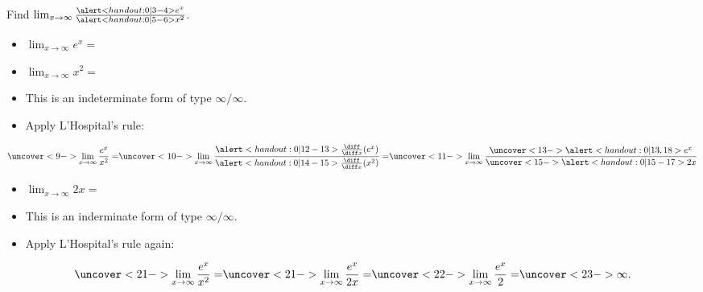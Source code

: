 \begin{frame}
\begin{example}
Find $\lim_{x\rightarrow \infty}\frac{\alert<handout:0| 3-4>{e^x}}{\alert<handout:0| 5-6>{x^2}}$.
\begin{itemize}
\item<2-| alert@3-4,18>  $\lim_{x\rightarrow \infty} e^x = $ 
\item<2-| alert@5-6>  $\lim_{x\rightarrow \infty} x^2 = $ 
\item<7->  This is an indeterminate form of type $\infty /\infty$.
\item<8->  Apply L'Hospital's rule:
\end{itemize}
\abovedisplayskip=0pt
\belowdisplayskip=0pt
\[
\uncover<9->{%
\lim_{x\rightarrow \infty} \frac{e^x}{x^2} = %
}%
\uncover<10->{%
\lim_{x\rightarrow \infty} \frac{\alert<handout:0| 12-13>{\frac{\diff}{\diff x} (e^x)}}{\alert<handout:0| 14-15>{\frac{\diff}{\diff x} (x^2)}} = %
}%
\uncover<11->{%
\lim_{x\rightarrow \infty} \frac{\uncover<13->{\alert<handout:0| 13,18>{e^x}}}{\uncover<15->{\alert<handout:0| 15-17>{2x}}} %
}%
\]
\begin{itemize}
\item<16-| alert@16-17>  $\lim_{x\rightarrow \infty} 2x = $ 
\item<19->  This is an inderminate form of type $\infty /\infty$.
\item<20->  Apply L'Hospital's rule again:
\end{itemize}
\[
\uncover<21->{%
\lim_{x\rightarrow \infty} \frac{e^x}{x^2} = %
}%
\uncover<21->{%
\lim_{x\rightarrow \infty} \frac{e^x}{2x} = %
}%
\uncover<22->{%
\lim_{x\rightarrow \infty} \frac{e^x}{2} = %
}%
\uncover<23->{%
\infty .%
}%
\]
\end{example}
\end{frame}
